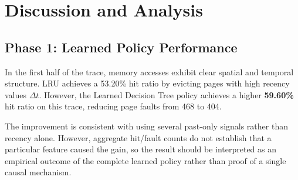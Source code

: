 \documentclass[10pt,twocolumn,a4paper]{article}
\begin{document}
\begin{table}[h]
\centering
\small
\caption{Performance Metrics Segmented by Workload Phase}
\label{tab:summary_results}
\end{table}

\section{Discussion and Analysis}
\subsection{Phase 1: Learned Policy Performance}
In the first half of the trace, memory accesses exhibit clear spatial and temporal structure. LRU achieves a 53.20\% hit ratio by evicting pages with high recency values $\Delta t$. However, the Learned Decision Tree policy achieves a higher \textbf{59.60\%} hit ratio on this trace, reducing page faults from 468 to 404. 

The improvement is consistent with using several past-only signals rather than recency alone. However, aggregate hit/fault counts do not establish that a particular feature caused the gain, so the result should be interpreted as an empirical outcome of the complete learned policy rather than proof of a single causal mechanism.
\end{document}

